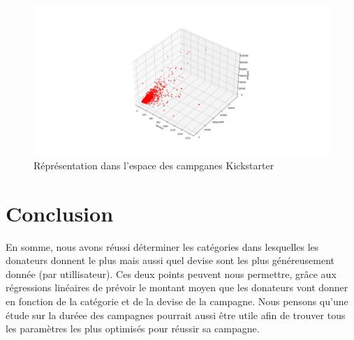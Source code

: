\documentclass{article}
\begin{document}
\begin{figure}[htbp]
    \graphicspath{{graph/}} 
    \centerline{\includegraphics[scale=0.3]{goal_pledged_backers.jpg}}
    \caption{Réprésentation dans l'espace des campganes Kickstarter}
    \label{fig_reussite}
\end{figure}

\newpage

\section{Conclusion}
\label{Conclusion}
\tabto{1cm} En somme, nous avons réussi déterminer les catégories dans lesquelles les donateurs donnent le plus mais aussi quel devise sont les plus généreusement donnée (par utillisateur). Ces deux points peuvent nous permettre, grâce aux régressions linéaires de prévoir le montant moyen que les donateurs vont 
donner en fonction de la catégorie et de la devise de la campagne. Nous pensons qu'une étude sur la duréee des campagnes pourrait aussi être utile afin de trouver tous les paramètres les plus optimisés pour réussir sa campagne. 
\end{document}
